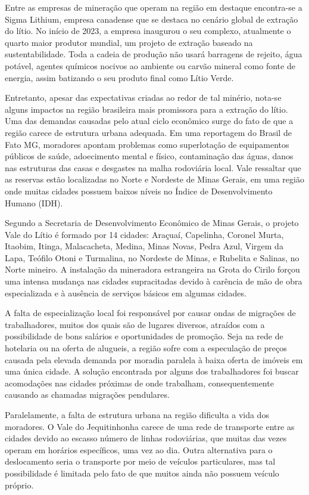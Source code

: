 Entre as empresas de mineração que operam na região em destaque encontra-se a Sigma Lithium, empresa canadense que se destaca no cenário global de extração do lítio. No início de 2023, a empresa inaugurou o seu complexo, atualmente o quarto maior produtor mundial, um projeto de extração baseado na sustentabilidade. Toda a cadeia de produção não usará barragens de rejeito, água potável, agentes químicos nocivos ao ambiente ou carvão mineral como fonte de energia, assim batizando o seu produto final como Lítio Verde.

Entretanto, apesar das expectativas criadas ao redor de tal minério, nota-se alguns impactos na região brasileira mais promissora para a extração do lítio. Uma das demandas causadas pelo atual ciclo econômico surge do fato de que a região carece de estrutura urbana adequada. Em uma reportagem do Brasil de Fato MG, moradores apontam problemas como superlotação de equipamentos públicos de saúde, adoecimento mental e físico, contaminação das águas, danos nas estruturas das casas e desgastes na malha rodoviária local. Vale ressaltar que as reservas estão localizadas no Norte e Nordeste de Minas Gerais, em uma região onde muitas cidades possuem baixos níveis no Índice de Desenvolvimento Humano (IDH).

Segundo a Secretaria de Desenvolvimento Econômico de Minas Gerais, o projeto Vale do Lítio é formado por 14 cidades: Araçuaí, Capelinha, Coronel Murta, Itaobim, Itinga, Malacacheta, Medina, Minas Novas, Pedra Azul, Virgem da Lapa, Teófilo Otoni e Turmalina, no Nordeste de Minas, e Rubelita e Salinas, no Norte mineiro. A instalação da mineradora estrangeira na Grota do Cirilo forçou uma intensa mudança nas cidades supracitadas devido à carência de mão de obra especializada e à ausência de serviços básicos em algumas cidades.

A falta de especialização local foi responsável por causar ondas de migrações de trabalhadores, muitos dos quais são de lugares diversos, atraídos com a possibilidade de bons salários e oportunidades de promoção. Seja na rede de hotelaria ou na oferta de alugueis, a região sofre com a especulação de preços causada pela elevada demanda por moradia paralela à baixa oferta de imóveis em uma única cidade. A solução encontrada por alguns dos trabalhadores foi buscar acomodações nas cidades próximas de onde trabalham, consequentemente causando as chamadas migrações pendulares.

Paralelamente, a falta de estrutura urbana na região dificulta a vida dos moradores. O Vale do Jequitinhonha carece de uma rede de transporte entre as cidades devido ao escasso número de linhas rodoviárias, que muitas das vezes operam em horários específicos, uma vez ao dia. Outra alternativa para o deslocamento seria o transporte por meio de veículos particulares, mas tal possibilidade é limitada pelo fato de que muitos ainda não possuem veículo próprio.

